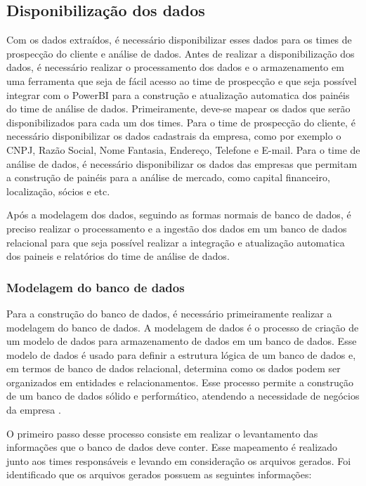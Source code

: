 \subsection{Disponibilização dos dados}

Com os dados extraídos, é necessário disponibilizar esses dados para os times de prospecção do cliente e análise de dados. Antes de realizar a disponibilização dos dados, é necessário realizar o processamento dos dados e o armazenamento em uma ferramenta que seja de fácil acesso ao time de prospecção e que seja possível integrar com o PowerBI para a construção e atualização automatica dos painéis do time de análise de dados. Primeiramente, deve-se mapear os dados que serão disponibilizados para cada um dos times. Para o time de prospecção do cliente, é necessário disponibilizar os dados cadastrais da empresa, como por exemplo o CNPJ, Razão Social, Nome Fantasia, Endereço, Telefone e E-mail. Para o time de análise de dados, é necessário disponibilizar os dados das empresas que permitam a construção de painéis para a análise de mercado, como capital financeiro, localização, sócios e etc.

Após a modelagem dos dados, seguindo as formas normais de banco de dados, é preciso realizar o processamento e a ingestão dos dados em um banco de dados relacional para que seja possível realizar a integração e atualização automatica dos paineis e relatórios do time de análise de dados.


\subsubsection{Modelagem do banco de dados}

Para a construção do banco de dados, é necessário primeiramente realizar a modelagem do banco de dados. A modelagem de dados é o processo de criação de um modelo de dados para armazenamento de dados em um banco de dados. Esse modelo de dados é usado para definir a estrutura lógica de um banco de dados e, em termos de banco de dados relacional, determina como os dados podem ser organizados em entidades e relacionamentos. Esse processo permite a construção de um banco de dados sólido e performático, atendendo a necessidade de negócios da empresa \cite{Golfarelli2003}.

O primeiro passo desse processo consiste em realizar o levantamento das informações que o banco de dados deve conter. Esse mapeamento é realizado junto aos times responsáveis e levando em consideração os arquivos gerados. Foi identificado que os arquivos gerados possuem as seguintes informações:

